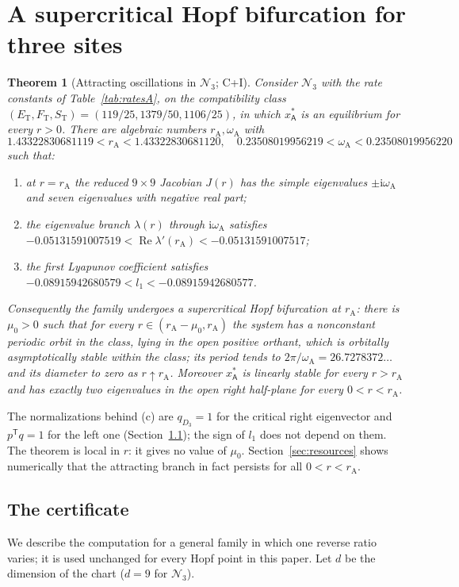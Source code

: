 \documentclass[11pt,a4paper]{article}
\theoremstyle{plain}
\newtheorem{theorem}{Theorem}[section]
\theoremstyle{definition}
\theoremstyle{remark}
\newcommand{\ii}{\mathrm i}
\newcommand{\T}{\mathsf T}
\newcommand{\cN}{\mathcal N}
\newcommand{\ET}{E_{\mathrm T}}
\newcommand{\FT}{F_{\mathrm T}}
\newcommand{\ST}{S_{\mathrm T}}
\newcommand{\rA}{r_{\mathrm A}}
\newcommand{\omA}{\omega_{\mathrm A}}
\newcommand{\WA}{\mathsf A}
\DeclareMathOperator{\Ree}{Re}
\newcommand{\evC}{\textsf{C}}
\newcommand{\evI}{\textsf{I}}
\begin{document}
\section{A supercritical Hopf bifurcation for three sites}\label{sec:hopf}

\begin{theorem}[Attracting oscillations in $\cN_3$; \evC+\evI]\label{thm:main}
Consider $\cN_3$ with the rate constants of Table~\ref{tab:ratesA}, on the compatibility class $(\ET,\FT,\ST)=(119/25,1379/50,1106/25)$, in which $x^*_{\WA}$ is an equilibrium for every $r>0$. There are algebraic numbers $\rA,\omA$ with
\[
 1.43322830681119<\rA<1.43322830681120,\quad 0.23508019956219<\omA<0.23508019956220
\]
such that:
\begin{enumerate}[label=\textup{(\alph*)}]
\item at $r=\rA$ the reduced $9\times9$ Jacobian $J(r)$ has the simple eigenvalues $\pm\ii\omA$ and seven eigenvalues with negative real part;
\item the eigenvalue branch $\lambda(r)$ through $\ii\omA$ satisfies $-0.05131591007519<\Ree\lambda'(\rA)<-0.05131591007517$;
\item the first Lyapunov coefficient satisfies $-0.08915942680579<l_1<-0.08915942680577$.
\end{enumerate}
Consequently the family undergoes a supercritical Hopf bifurcation at $\rA$: there is $\mu_0>0$ such that for every $r\in(\rA-\mu_0,\rA)$ the system has a nonconstant periodic orbit in the class, lying in the open positive orthant, which is orbitally asymptotically stable within the class; its period tends to $2\pi/\omA=26.7278372\ldots$ and its diameter to zero as $r\uparrow\rA$. Moreover $x^*_{\WA}$ is linearly stable for every $r>\rA$ and has exactly two eigenvalues in the open right half-plane for every $0<r<\rA$.
\end{theorem}

The normalizations behind \textup{(c)} are $q_{D_3}=1$ for the critical right eigenvector and $p^{\T}q=1$ for the left one (Section~\ref{sec:cert}); the sign of $l_1$ does not depend on them. The theorem is local in $r$: it gives no value of $\mu_0$. Section~\ref{sec:resources} shows numerically that the attracting branch in fact persists for all $0<r<\rA$.

\subsection{The certificate}\label{sec:cert}
We describe the computation for a general family in which one reverse ratio varies; it is used unchanged for every Hopf point in this paper. Let $d$ be the dimension of the chart ($d=9$ for $\cN_3$).
\end{document}
